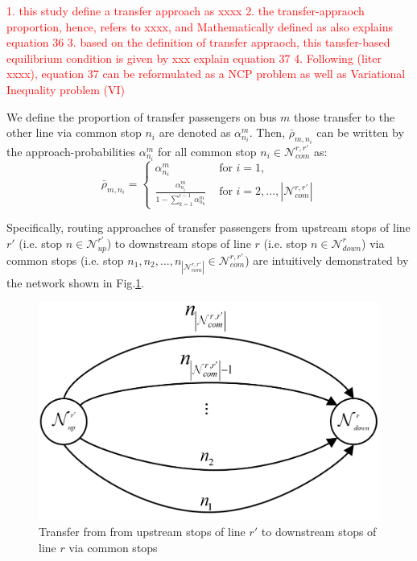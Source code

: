 \documentclass[smallextended]{svjour3}       %
\begin{document}
\begin{Abstract}
\textcolor{red}{
    1. this study define a transfer approach as xxxx
    2. the transfer-appraoch proportion, hence, refers to xxxx, and Mathematically defined as
        also explains equation 36
    3. based on the definition of transfer appraoch, this tansfer-based equilibrium condition is given by xxx
       explain equation 37
    4. Following (liter xxxx), equation 37 can be reformulated as a NCP problem as well as Variational Inequality problem (VI)
}

We define the proportion of transfer passengers on bus $m$ 
those transfer to the other line via common stop $n_{i}$ 
are denoted as $\alpha_{n_{i}}^{m}$. 
Then, $\bar{\rho}_{m,n_{i}}$ can be written by the approach-probabilities $\alpha_{n_{i}}^{m}$ for all common stop $n_{i}\in\mathcal{N}_{com}^{r,r'}$ as:
\begin{equation}
    \bar{\rho}_{m,n_{i}} =
    \begin{cases}
        \alpha_{n_{i}}^{m}&\text{ for } i=1,\\
        \frac{\alpha_{n_{i}}^{m}}{1-\sum\limits_{k=1}^{i-1} \alpha_{n_{k}}^{m}}&\text{ for }i=2,...,\left|\mathcal{N}_{com}^{r,r'}\right|
    \end{cases} 
\end{equation}

Specifically, routing approaches of transfer passengers
from upstream stops of line $r'$ (i.e. stop $n\in\mathcal{N}_{up}^{r'}$) 
to downstream stops of line $r$ (i.e. stop $n \in \mathcal{N}_{down}^{r}$) 
via common stops (i.e. stop $n_{1},n_{2},...,n_{\left|\mathcal{N}_{com}^{r,r'}\right|}\in \mathcal{N}_{com}^{r,r'}$)
are intuitively demonstrated by the network shown in \textup{Fig.\ref{transfer choice network}}. 
\begin{figure}[H]
    \centering
    \includegraphics[width=0.5\linewidth]{CASPT2021paper_fig/transfer choice network.png}
    \caption{Transfer from from upstream stops of line $r'$ to downstream stops of line $r$ via common stops}
    \label{transfer choice network}
\end{figure}


\end{Abstract}
\end{document}

